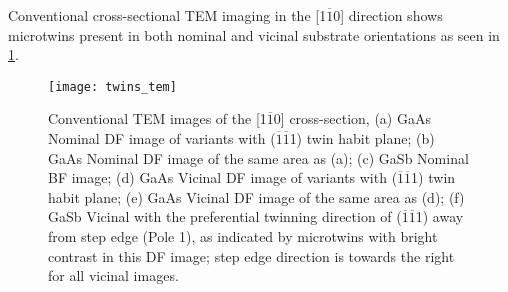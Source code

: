 Conventional cross-sectional TEM imaging in the [1$\overline{1}$0] direction shows microtwins present in both nominal and vicinal substrate orientations as seen in \cref{fig:twins_tem}. 

\begin{figure}
    \centering
    \texttt{[image: twins\_tem]}
    \caption{Conventional TEM images of the [1$\overline{1}$0] cross-section, (a) GaAs Nominal DF image of variants with ($\overline{1}\overline{1}$1) twin habit plane; (b) GaAs Nominal DF image of the same area as (a); (c) GaSb Nominal BF image; (d) GaAs Vicinal DF image of variants with ($\overline{1}\overline{1}$1) twin habit plane; (e) GaAs Vicinal DF image of the same area as (d); (f) GaSb Vicinal with the preferential twinning direction of ($\overline{1}\overline{1}$1) away from step edge (Pole 1), as indicated by microtwins with bright contrast in this DF image; step edge direction is towards the right for all vicinal images.\label{fig:twins_tem}}
\end{figure}